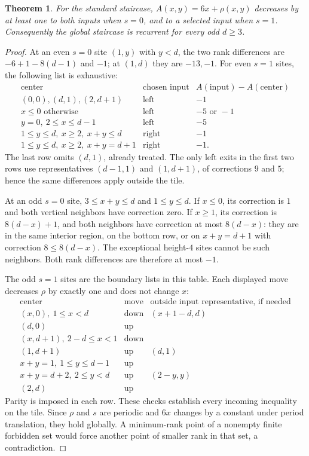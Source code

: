 \documentclass[11pt]{article}
\newtheorem{theorem}{Theorem}
\begin{document}
\begin{theorem}\label{thm:standard}
For the standard staircase, $A(x,y)=6x+\rho(x,y)$ decreases by at
least one to both inputs when $s=0$, and to a selected input when
$s=1$. Consequently the global staircase is recurrent for every odd
$d\ge3$.
\end{theorem}
\begin{proof}
At an even $s=0$ site $(1,y)$ with $y<d$, the two rank differences
are $-6+1-8(d-1)$ and $-1$; at $(1,d)$ they are $-13,-1$.
For even $s=1$ sites, the following list is exhaustive:
\[
\begin{array}{l|c|c}
\text{center}&\text{chosen input}&A(\text{input})-A(\text{center})\\\hline
(0,0),(d,1),(2,d+1)&\text{left}&-1\\
x\le0\text{ otherwise}&\text{left}&-5\text{ or }-1\\
y=0,\ 2\le x\le d-1&\text{left}&-5\\
1\le y\le d,\ x\ge2,\ x+y\le d&\text{right}&-1\\
1\le y\le d,\ x\ge2,\ x+y=d+1&\text{right}&-1.
\end{array}                                                    \tag{3}
\]
The last row omits $(d,1)$, already treated. The only left exits in
the first two rows use representatives $(d-1,1)$ and $(1,d+1)$,
of corrections $9$ and $5$; hence the same differences apply outside
the tile.

At an odd $s=0$ site, $3\le x+y\le d$ and $1\le y\le d$.
If $x\le0$, its correction is $1$ and both vertical neighbors have
correction zero. If $x\ge1$, its correction is $8(d-x)+1$, and both
neighbors have correction at most $8(d-x)$: they are in the same
interior region, on the bottom row, or on $x+y=d+1$ with correction
$8\le8(d-x)$. The exceptional height-$4$ sites cannot be such
neighbors. Both rank differences are therefore at most $-1$.

The odd $s=1$ sites are the boundary lists in this table. Each displayed
move decreases $\rho$ by exactly one and does not change $x$:
\[
\begin{array}{l|c|l}
\text{center}&\text{move}&\text{outside input representative, if needed}\\\hline
(x,0),\ 1\le x<d&\text{down}&(x+1-d,d)\\
(d,0)&\text{up}&\\
(x,d+1),\ 2-d\le x<1&\text{down}&\\
(1,d+1)&\text{up}&(d,1)\\
x+y=1,\ 1\le y\le d-1&\text{up}&\\
x+y=d+2,\ 2\le y<d&\text{up}&(2-y,y)\\
(2,d)&\text{up}&
\end{array}                                                    \tag{4}
\]
Parity is imposed in each row. These checks establish every incoming
inequality on the tile. Since $\rho$ and $s$ are periodic and $6x$
changes by a constant under period translation, they hold globally.
A minimum-rank point of a nonempty finite forbidden set would force
another point of smaller rank in that set, a contradiction.
\end{proof}
\end{document}
